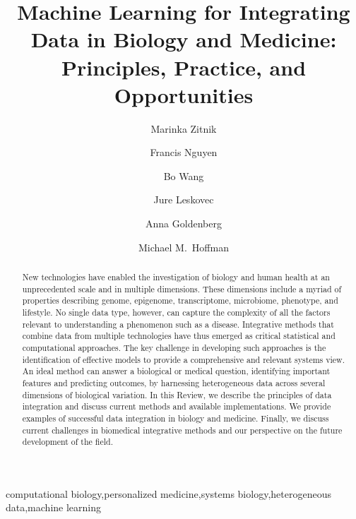 \documentclass[5p]{elsarticle}
\newcommand{\rev}[1]{{\color{black}#1}}
\begin{document}
\begin{frontmatter}

\title{Machine Learning for Integrating Data in Biology and Medicine:\\ Principles, Practice, and Opportunities}

\author[stanford,corr]{Marinka Zitnik}
\author[toronto-biophysics,toronto-cancer]{Francis Nguyen} %
\author[bo]{Bo Wang}
\author[stanford,biohub,corr]{Jure Leskovec}
\author[toronto-sickchildren,toronto-cs,toronto-vector,corr]{Anna Goldenberg}
\author[toronto-biophysics,toronto-cancer,toronto-cs,toronto-vector,corr]{Michael M.~Hoffman} %

\address[stanford]{Department of Computer Science, Stanford University, Stanford, CA, USA}
\address[toronto-biophysics]{Department of Medical Biophysics, University of Toronto, Toronto, ON, Canada}
\address[toronto-cancer]{Princess Margaret Cancer Centre, Toronto, ON, Canada}
\address[bo]{Hikvision Research Institute, Santa Clara, CA, USA}
\address[biohub]{Chan Zuckerberg Biohub, San Francisco, CA, USA}
\address[toronto-sickchildren]{Genetics \& Genome Biology, SickKids Research Institute, Toronto, ON, Canada}
\address[toronto-cs]{Department of Computer Science, University of Toronto, Toronto, ON, Canada}
\address[toronto-vector]{Vector Institute, Toronto, ON, Canada\\[2mm]}
\address[corr]{{\em Corresponding authors}}

\begin{abstract}
New technologies have enabled the investigation of biology and human health at an unprecedented scale and in multiple dimensions.
These dimensions include \rev{a myriad of} properties describing genome, epigenome, transcriptome, microbiome, phenotype, and lifestyle.
No single data type, however, can capture the complexity of all the factors relevant to understanding a phenomenon such as a disease.
Integrative methods that combine data from multiple technologies have thus emerged as critical statistical and computational approaches.
The key challenge in developing such approaches is the identification of effective models to provide a comprehensive and relevant systems view.
An ideal method can answer a biological or medical question, identifying important features and predicting outcomes, by harnessing heterogeneous data across several dimensions of biological variation.
In this Review, we describe the principles of data integration and discuss current methods and available implementations.
We provide examples of successful data integration in biology and medicine.
Finally, we discuss current challenges in biomedical integrative methods and our perspective on the future development of the field.
\end{abstract}

\begin{keyword}
computational biology\sep personalized medicine\sep systems biology\sep heterogeneous data\sep machine learning
\end{keyword}

\end{frontmatter}
\end{document}
